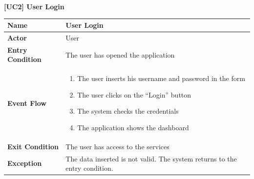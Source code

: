 \documentclass{article}
\begin{document}
\begin{table}
 \renewcommand{\arraystretch}{1.5}
    \centering
    \raggedright\textbf{[UC2] User Login}
    \begin{tabular}{|l|p{10cm}|}
        \hline
        \textbf{Name} & User Login \\
        \hline
        \textbf{Actor} & User \\
        \hline
        \textbf{Entry Condition} & 
        The user has opened the application\\
        \hline
        \textbf{Event Flow} & 
        \begin{enumerate}[align=left, topsep=0pt, partopsep=0pt]
            \item The user inserts his username and password in the form
            \item The user clicks on the “Login” button
            \item The system checks the credentials
            \item The application shows the dashboard
        \end{enumerate} \\
        \hline
        \textbf{Exit Condition} & The user has access to the services  \\
        \hline
        \textbf{Exception} & The data inserted is not valid. The system returns to the entry condition. \\
        \hline
    \end{tabular}
\end{table}
\end{document}
